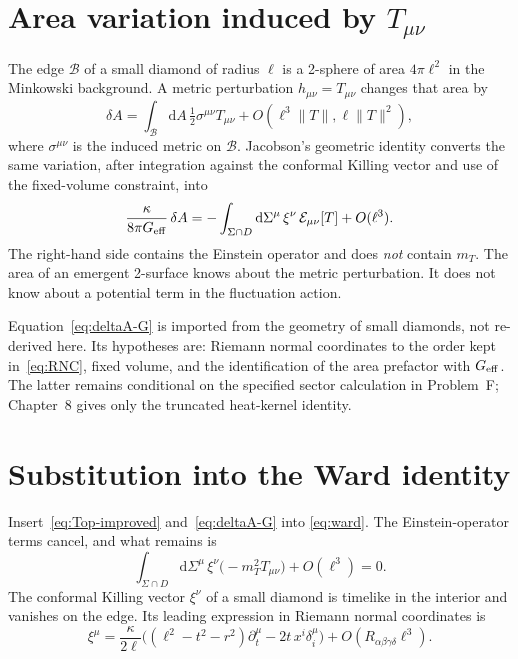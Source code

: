 \section{Area variation induced by \(T_{\mu\nu}\)}
\label{sec:ch7-area}

The edge \(\mathcal{B}\) of a small diamond of radius \(\ell\) is a
2-sphere of area \(4\pi\ell^2\) in the Minkowski background. A
metric perturbation \(h_{\mu\nu}=T_{\mu\nu}\) changes that area by
\begin{equation}
  \label{eq:deltaA}
  \delta A
  =\int_{\mathcal{B}}
   \mathrm{d}A\,
   \tfrac12\sigma^{\mu\nu}T_{\mu\nu}
   +O(\ell^3\|T\|,\ell\|T\|^2),
\end{equation}
where \(\sigma^{\mu\nu}\) is the induced metric on \(\mathcal{B}\).
Jacobson's geometric identity converts the same variation, after
integration against the conformal Killing vector and use of the
fixed-volume constraint, into
\begin{equation}
  \label{eq:deltaA-G}
  \frac{\kappa}{8\pi G_{\mathrm{eff}}}\,\delta A
  =
  -\int_{\Sigma\cap D}
   \mathrm{d}\Sigma^\mu\,\xi^\nu
   \,\mathcal{E}_{\mu\nu}[T]
   +O(\ell^3).
\end{equation}
The right-hand side contains the Einstein operator and does
\emph{not} contain \(m_T\). The area of an emergent 2-surface knows
about the metric perturbation. It does not know about a potential
term in the fluctuation action.

Equation~\eqref{eq:deltaA-G} is imported from the geometry of small
diamonds, not re-derived here. Its hypotheses are: Riemann normal
coordinates to the order kept in~\eqref{eq:RNC}, fixed volume, and
the identification of the area prefactor with \(G_{\mathrm{eff}}\). The latter
remains conditional on the specified sector calculation in Problem~F;
Chapter~8 gives only the truncated heat-kernel identity.

\section{Substitution into the Ward identity}
\label{sec:ch7-substitution}

Insert~\eqref{eq:Top-improved} and~\eqref{eq:deltaA-G} into
\eqref{eq:ward}. The Einstein-operator terms cancel, and what
remains is
\begin{equation}
  \label{eq:mass-identity}
  \int_{\Sigma\cap D}
  \mathrm{d}\Sigma^\mu\,\xi^\nu
  \bigl(-m_T^2 T_{\mu\nu}\bigr)
  +O(\ell^3)
  =0.
\end{equation}
The conformal Killing vector \(\xi^\nu\) of a small diamond is
timelike in the interior and vanishes on the edge. Its leading
expression in Riemann normal coordinates is
\begin{equation}
  \label{eq:xi-RNC}
  \xi^\mu
  =\frac{\kappa}{2\ell}
   \bigl((\ell^2-t^2-r^2)\partial_t^\mu-2t\,x^i\delta^\mu_i\bigr)
   +O(R_{\alpha\beta\gamma\delta}\ell^3).
\end{equation}


